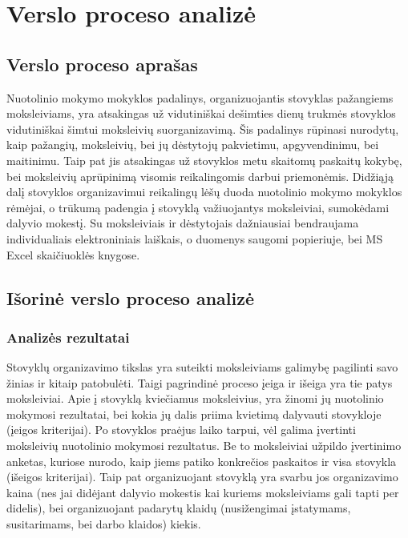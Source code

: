 \chapter{Verslo proceso analizė}

\section{Verslo proceso aprašas}

Nuotolinio mokymo mokyklos padalinys, organizuojantis stovyklas pažangiems
moksleiviams, yra atsakingas už vidutiniškai dešimties dienų trukmės
stovyklos vidutiniškai šimtui moksleivių suorganizavimą. Šis padalinys
rūpinasi nurodytų, kaip pažangių, moksleivių, bei jų dėstytojų pakvietimu, 
apgyvendinimu, bei maitinimu. Taip pat jis atsakingas už stovyklos metu 
skaitomų paskaitų kokybę, bei moksleivių aprūpinimą visomis reikalingomis
darbui priemonėmis. Didžiąją dalį stovyklos organizavimui reikalingų lėšų
duoda nuotolinio mokymo mokyklos rėmėjai, o trūkumą padengia į stovyklą
važiuojantys moksleiviai, sumokėdami dalyvio mokestį. Su moksleiviais ir
dėstytojais dažniausiai bendraujama individualiais elektroniniais 
laiškais, o duomenys saugomi popieriuje, bei MS Excel skaičiuoklės knygose.

\section{Išorinė verslo proceso analizė}

\subsection{Analizės rezultatai}

Stovyklų organizavimo tikslas yra suteikti moksleiviams galimybę pagilinti
savo žinias ir kitaip patobulėti. Taigi pagrindinė proceso įeiga ir išeiga
yra tie patys moksleiviai. Apie į stovyklą kviečiamus moksleivius, yra
žinomi jų nuotolinio mokymosi rezultatai, bei kokia jų dalis priima 
kvietimą dalyvauti stovykloje (įeigos kriterijai). Po stovyklos
praėjus laiko tarpui, vėl galima įvertinti moksleivių nuotolinio
mokymosi rezultatus. Be to moksleiviai užpildo įvertinimo anketas, kuriose
nurodo, kaip jiems patiko konkrečios paskaitos ir visa stovykla
(išeigos kriterijai). Taip pat organizuojant stovyklą yra svarbu jos 
organizavimo kaina (nes jai didėjant dalyvio mokestis kai kuriems 
moksleiviams gali tapti per didelis), bei organizuojant padarytų klaidų
(nusižengimai įstatymams, susitarimams, bei darbo klaidos) kiekis. %

